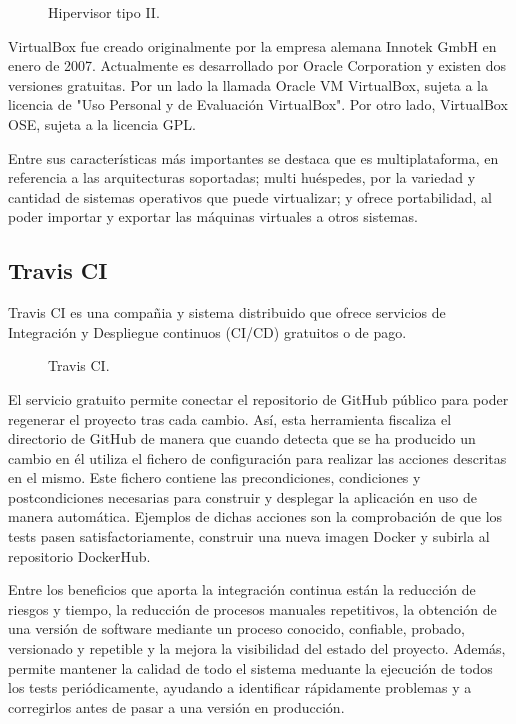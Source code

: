 \begin{figure}[H]
\caption{Hipervisor tipo II.\label{fig:figure_placement_example}}
\end{figure}

VirtualBox fue creado originalmente por la empresa alemana Innotek GmbH en enero de 2007. Actualmente es desarrollado por Oracle Corporation y existen dos versiones gratuitas. Por un lado la llamada Oracle VM VirtualBox, sujeta a la licencia de "Uso Personal y de Evaluación VirtualBox". Por otro lado, VirtualBox OSE, sujeta a la licencia GPL.

Entre sus características más importantes se destaca que es multiplataforma, en referencia a las arquitecturas soportadas; multi huéspedes, por la variedad y cantidad de sistemas operativos que puede virtualizar; y ofrece portabilidad, al poder importar y exportar las máquinas virtuales a otros sistemas.

\subsection{Travis CI}

Travis CI es una compañia y sistema distribuido que ofrece servicios de Integración y Despliegue continuos (CI/CD) gratuitos o de pago.

\begin{figure}[H]
\caption{Travis CI.\label{fig:figure_placement_example}}
\end{figure}

El servicio gratuito permite conectar el repositorio de GitHub público para poder regenerar el proyecto tras cada cambio. Así, esta herramienta fiscaliza el directorio de GitHub de manera que cuando detecta que se ha producido un cambio en él utiliza el fichero de configuración  para realizar las acciones descritas en el mismo. Este fichero contiene las precondiciones, condiciones y postcondiciones necesarias para construir y desplegar la aplicación en uso de manera automática. Ejemplos de dichas acciones son la comprobación de que los tests pasen satisfactoriamente, construir una nueva imagen Docker y subirla al repositorio DockerHub.

Entre los beneficios que aporta la integración continua están la reducción de riesgos y tiempo, la reducción de procesos manuales repetitivos, la obtención de una versión de software mediante un proceso conocido, confiable, probado, versionado y repetible y la mejora la visibilidad del estado del proyecto. Además, permite mantener la calidad de todo el sistema meduante la ejecución de todos los tests periódicamente, ayudando a identificar rápidamente problemas y a corregirlos antes de pasar a una versión en producción.

